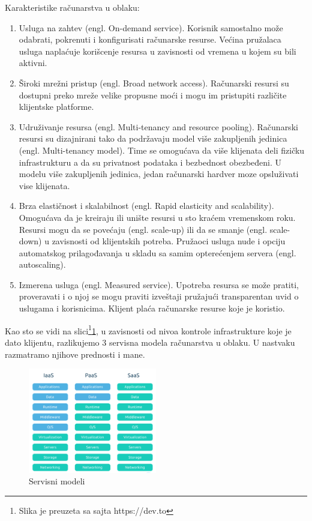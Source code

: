 \documentclass[12pt,oneside]{memoir}
\begin{document}
Karakteristike računarstva u oblaku:
\begin{enumerate}
  \item Usluga na zahtev (engl. On-demand service). Korisnik samostalno može odabrati, pokrenuti i konfigurisati računarske resurse. Većina pružalaca usluga naplaćuje korišcenje resursa u zavisnosti od vremena u kojem su bili aktivni.
  \item Široki mrežni pristup (engl. Broad network access). Računarski resursi su dostupni preko mreže velike propusne moći i mogu im pristupiti različite klijentske platforme.
  \item Udruživanje resursa (engl. Multi-tenancy and resource pooling). Računarski resursi su dizajnirani tako da podržavaju model više zakupljenih jedinica (engl. Multi-tenancy model). Time se omogućava da više klijenata deli fizičku infrastrukturu a da su privatnost podataka i bezbednost obezbeđeni. U modelu više zakupljenih jedinica, jedan računarski hardver moze opsluživati vise klijenata.
  \item Brza elastičnost i skalabilnost (engl. Rapid elasticity and scalability). Omogućava da je kreiraju ili unište resursi u sto kraćem vremenskom roku. Resursi mogu da se povećaju (engl. scale-up) ili da se smanje (engl. scale-down) u zavisnosti od klijentskih potreba. Pružaoci usluga nude i opciju automatskog prilagođavanja u skladu sa samim opterećenjem servera (engl. autoscaling).
  \item Izmerena usluga (engl. Measured service). Upotreba resursa se može pratiti, proveravati i o njoj se mogu praviti izveštaji pružajući transparentan uvid o uslugama i korisnicima. Klijent plaća računarske resurse koje je koristio.
\end{enumerate}

Kao sto se vidi na slici\footnote{Slika je preuzeta sa sajta https://dev.to}\ref{fig:servisniModeli}, u zavisnosti od nivoa kontrole infrastrukture koje je dato klijentu, razlikujemo 3 servisna modela računarstva u oblaku. U nastvaku razmatramo njihove prednosti i mane.

\begin{figure}[!ht]
  \centering
  \includegraphics[width=0.5\textwidth]{Slika 5.png}
  \caption{Servisni modeli}
  \label{fig:servisniModeli}
\end{figure}
 
\end{document}
